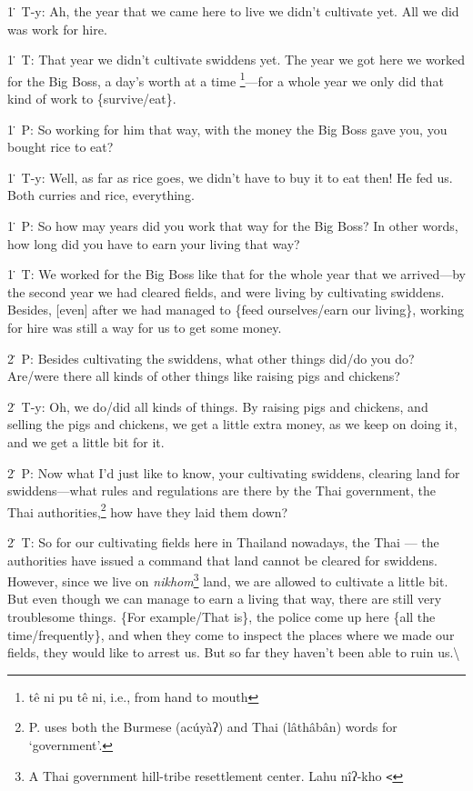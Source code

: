 1\. T-y: Ah, the year that we came here to live we didn't cultivate yet. All we
did was work for hire.

1\. T: That year we didn't cultivate swiddens yet. The year we got here we worked
for the Big Boss, a day's worth at a time \footnote{tê ni pu tê ni, i.e., from hand to mouth}---for a whole year we only did that
kind of work to \{survive/eat\}.

1\. P: So working for him that way, with the money the Big Boss gave you, you bought
rice to eat?

1\. T-y: Well, as far as rice goes, we didn't have to buy it to eat then! He fed
us. Both curries and rice, everything.

1\. P: So how may years did you work that way for the Big Boss? In other words,
how long did you have to earn your living that way?

1\. T: We worked for the Big Boss like that for the whole year that we arrived---by
the second year we had cleared fields, and were living by cultivating swiddens.
Besides, [even] after we had managed to \{feed ourselves/earn our living\}, working
for hire was still a way for us to get some money.

2\. P: Besides cultivating the swiddens, what other things did/do you do? Are/were
there all kinds of other things like raising pigs and chickens?

2\. T-y: Oh, we do/did all kinds of things. By raising pigs and chickens, and selling
the pigs and chickens, we get a little extra money, as we keep on doing it, and
we get a little bit for it.

2\. P: Now what I'd just like to know, your cultivating swiddens, clearing land
for swiddens---what rules and regulations are there by the Thai government, the
Thai authorities,\footnote{P. uses both the Burmese (acúyàʔ) and Thai (lâthâbân) words for `government'.} how have they laid them down?

2\. T: So for our cultivating fields here in Thailand nowadays, the Thai --- the
authorities have issued a command that land cannot be cleared for swiddens. However,
since we live on \textit{nikhom}\footnote{A Thai government hill-tribe resettlement center. Lahu nîʔ-kho \texttt{<}} land, we are allowed to cultivate a little
bit. But even though we can manage to earn a living that way, there are still very
troublesome things. \{For example/That is\}, the police come up here \{all the
time/frequently\}, and when they come to inspect the places where we made our fields,
they would like to arrest us. But so far they haven't been able to ruin us.\textbackslash{}

